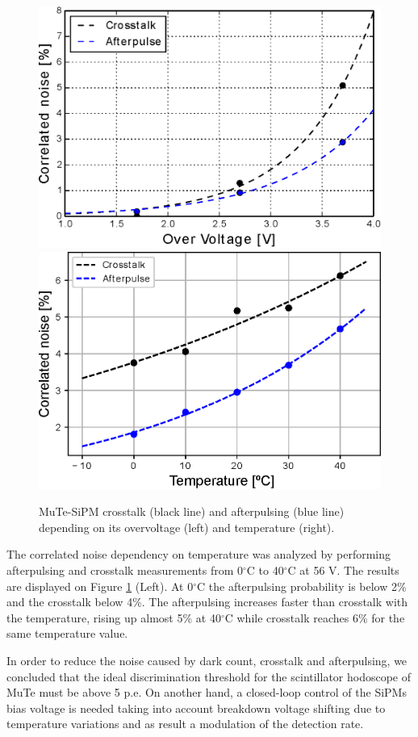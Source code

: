 \documentclass[a4paper,11pt]{article}
\begin{document}
\begin{figure}[htbp]
\centering 
\includegraphics[width=.48\textwidth]{Figures/CorrNoise_vs_Ov_1350CS.eps}
\quad
\includegraphics[width=.48\textwidth]{Figures/CorrNoise_vs_T_1350CS.eps}
\caption{MuTe-SiPM crosstalk (black line) and afterpulsing (blue line) depending on its overvoltage (left) and temperature (right).}
\label{fig:after_cross}
\end{figure}

The correlated noise dependency on temperature was analyzed by performing afterpulsing and crosstalk measurements from 0$^{\circ}$C to 40$^{\circ}$C at 56 V. The results are displayed on Figure \ref{fig:after_cross} (Left). At 0$^{\circ}$C the afterpulsing probability is below 2$\%$ and the crosstalk below 4$\%$. The afterpulsing increases faster than crosstalk with the temperature, rising up almost 5$\%$ at 40$^{\circ}$C while crosstalk reaches 6$\%$ for the same temperature value.

In order to reduce the noise caused by dark count, crosstalk and afterpulsing, we concluded that the ideal discrimination threshold for the scintillator hodoscope of MuTe must be above 5 p.e. On another hand, a closed-loop control of the SiPMs bias voltage is needed taking into account breakdown voltage shifting due to temperature variations and as result a modulation of the detection rate.

\end{document}
